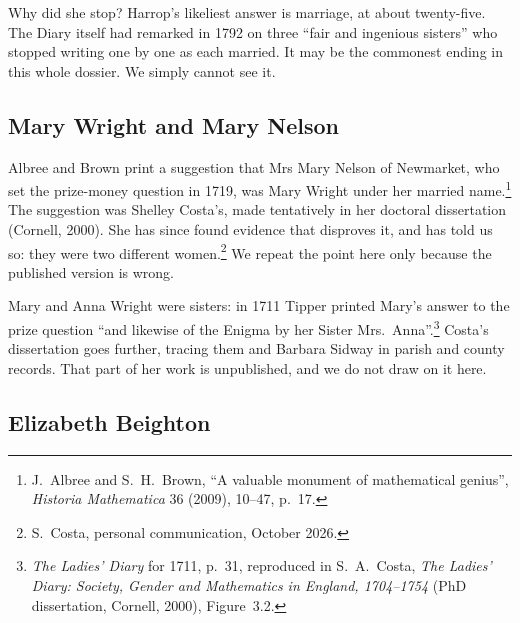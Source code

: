 \documentclass[11pt,a4paper]{article}
\begin{document}
Why did she stop? Harrop's likeliest answer is marriage, at about twenty-five. The Diary
itself had remarked in 1792 on three ``fair and ingenious sisters'' who stopped writing
one by one as each married. It may be the commonest ending in this whole dossier. We
simply cannot see it.

\subsection*{Mary Wright and Mary Nelson}

Albree and Brown print a suggestion that Mrs Mary Nelson of Newmarket, who set the
prize-money question in 1719, was Mary Wright under her married name.\footnote{J.~Albree and S.~H.~Brown, ``A valuable monument of mathematical genius'', \textit{Historia Mathematica} 36 (2009), 10--47, p.~17.}
The suggestion was Shelley Costa's, made tentatively in her doctoral dissertation (Cornell, 2000).
She has since found evidence that disproves it, and has told us so: they were
two different women.\footnote{S.~Costa, personal communication, October 2026.} We
repeat the point here only because the published version is wrong.

Mary and Anna Wright were sisters: in 1711 Tipper printed Mary's answer to the prize
question ``and likewise of the Enigma by her Sister Mrs.\ Anna''.\footnote{\textit{The
Ladies' Diary} for 1711, p.~31, reproduced in S.~A.~Costa, \textit{The Ladies' Diary:
Society, Gender and Mathematics in England, 1704--1754} (PhD dissertation, Cornell, 2000),
Figure~3.2.} Costa's dissertation goes further, tracing them and Barbara Sidway in
parish and county records. That part of her work is unpublished, and we do not draw on
it here.

\subsection*{Elizabeth Beighton}
\end{document}

